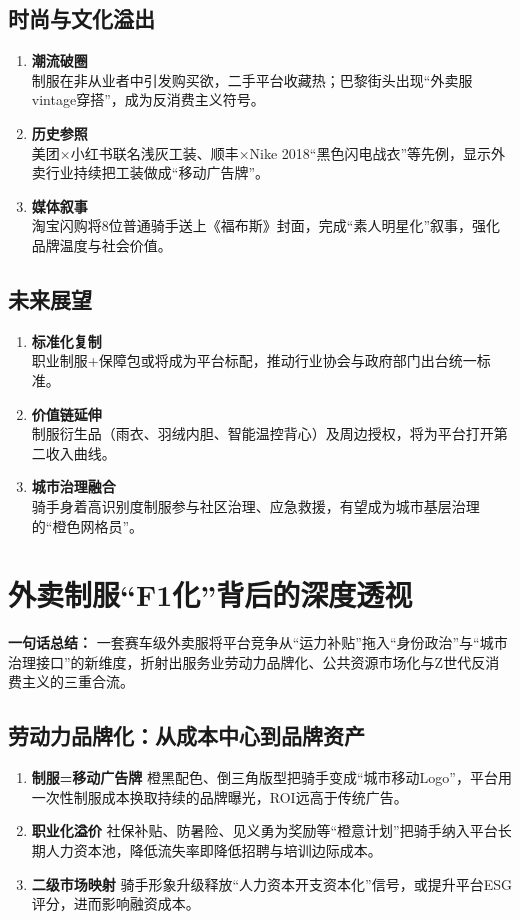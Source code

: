 \subsection{时尚与文化溢出}
\begin{enumerate}[leftmargin=*, nosep]
    \item \textbf{潮流破圈}  \\
    制服在非从业者中引发购买欲，二手平台收藏热；巴黎街头出现“外卖服vintage穿搭”，成为反消费主义符号。  
    \item \textbf{历史参照}  \\
    美团×小红书联名浅灰工装、顺丰×Nike 2018“黑色闪电战衣”等先例，显示外卖行业持续把工装做成“移动广告牌”。
    \item \textbf{媒体叙事}  \\
    淘宝闪购将8位普通骑手送上《福布斯》封面，完成“素人明星化”叙事，强化品牌温度与社会价值。
\end{enumerate}

\subsection{未来展望}
\begin{enumerate}[leftmargin=*, nosep]
    \item \textbf{标准化复制}  \\
    职业制服+保障包或将成为平台标配，推动行业协会与政府部门出台统一标准。
    \item \textbf{价值链延伸}  \\
    制服衍生品（雨衣、羽绒内胆、智能温控背心）及周边授权，将为平台打开第二收入曲线。
    \item \textbf{城市治理融合}  \\
    骑手身着高识别度制服参与社区治理、应急救援，有望成为城市基层治理的“橙色网格员”。
\end{enumerate}

\clearpage

\section{外卖制服“F1化”背后的深度透视}
\textbf{一句话总结：}  
一套赛车级外卖服将平台竞争从“运力补贴”拖入“身份政治”与“城市治理接口”的新维度，折射出服务业劳动力品牌化、公共资源市场化与Z世代反消费主义的三重合流。

\subsection{劳动力品牌化：从成本中心到品牌资产}
\begin{enumerate}[leftmargin=*, nosep]
    \item \textbf{制服=移动广告牌}  
    橙黑配色、倒三角版型把骑手变成“城市移动Logo”，平台用一次性制服成本换取持续的品牌曝光，ROI远高于传统广告。
    \item \textbf{职业化溢价}  
    社保补贴、防暑险、见义勇为奖励等“橙意计划”把骑手纳入平台长期人力资本池，降低流失率即降低招聘与培训边际成本。
    \item \textbf{二级市场映射}  
    骑手形象升级释放“人力资本开支资本化”信号，或提升平台ESG评分，进而影响融资成本。
\end{enumerate}

